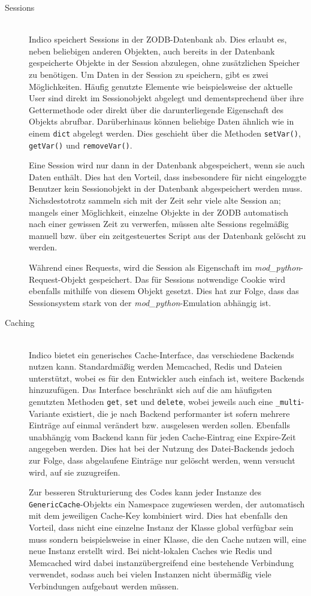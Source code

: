 \begin{description}
\item[Sessions] \hfill \\
Indico speichert Sessions in der ZODB-Datenbank ab. Dies erlaubt es, neben beliebigen anderen
Objekten, auch bereits in der Datenbank gespeicherte Objekte in der Session abzulegen, ohne
zusätzlichen Speicher zu benötigen. Um Daten in der Session zu speichern, gibt es zwei
Möglichkeiten. Häufig genutzte Elemente wie beispielsweise der aktuelle User sind direkt im
Sessionobjekt abgelegt und dementsprechend über ihre Gettermethode oder direkt über die
darunterliegende Eigenschaft des Objekts abrufbar. Darüberhinaus können beliebige Daten ähnlich wie
in einem \lstinline{dict} abgelegt werden. Dies geschieht über die Methoden \lstinline{setVar()},
\lstinline{getVar()} und \lstinline{removeVar()}.

Eine Session wird nur dann in der Datenbank abgespeichert, wenn sie auch Daten enthält. Dies hat den
Vorteil, dass insbesondere für nicht eingeloggte Benutzer kein Sessionobjekt in der Datenbank
abgespeichert werden muss. Nichsdestotrotz sammeln sich mit der Zeit sehr viele alte Session an;
mangels einer Möglichkeit, einzelne Objekte in der ZODB automatisch nach einer gewissen Zeit zu
verwerfen, müssen alte Sessions regelmäßig manuell bzw. über ein zeitgesteuertes Script aus der
Datenbank gelöscht zu werden.

Während eines Requests, wird die Session als Eigenschaft im \emph{mod\_python}-Request-Objekt
gespeichert. Das für Sessions notwendige Cookie wird ebenfalls mithilfe von diesem Objekt gesetzt.
Dies hat zur Folge, dass das Sessionsystem stark von der \emph{mod\_python}-Emulation abhängig ist.


\item[Caching] \hfill \\
Indico bietet ein generisches Cache-Interface, das verschiedene Backends nutzen kann.
Standardmäßig werden Memcached, Redis und Dateien unterstützt, wobei es für den Entwickler auch
einfach ist, weitere Backends hinzuzufügen. Das Interface beschränkt sich auf die am häufigsten
genutzten Methoden \lstinline{get}, \lstinline{set} und \lstinline{delete}, wobei jeweils auch
eine \lstinline{_multi}-Variante existiert, die je nach Backend performanter ist sofern mehrere
Einträge auf einmal verändert bzw. ausgelesen werden sollen. Ebenfalls unabhängig vom Backend kann
für jeden Cache-Eintrag eine Expire-Zeit angegeben werden. Dies hat bei der Nutzung des
Datei-Backends jedoch zur Folge, dass abgelaufene Einträge nur gelöscht werden, wenn versucht wird,
auf sie zuzugreifen.

Zur besseren Strukturierung des Codes kann jeder Instanze des \lstinline{GenericCache}-Objekts ein
Namespace zugewiesen werden, der automatisch mit dem jeweiligen Cache-Key kombiniert wird. Dies hat
ebenfalls den Vorteil, dass nicht eine einzelne Instanz der Klasse global verfügbar sein muss
sondern beispielsweise in einer Klasse, die den Cache nutzen will, eine neue Instanz erstellt wird.
Bei nicht-lokalen Caches wie Redis und Memcached wird dabei instanzübergreifend eine bestehende
Verbindung verwendet, sodass auch bei vielen Instanzen nicht übermäßig viele Verbindungen aufgebaut
werden müssen.


\end{description}
